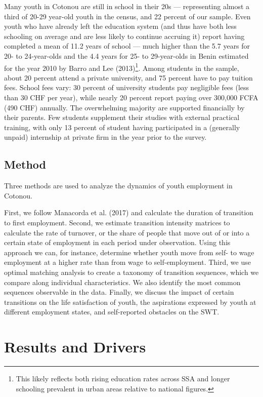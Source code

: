 \documentclass[
  11pt,
a4paper
]{article}
\begin{document}
Many youth in Cotonou are still in school in their 20s --- representing almost a third of 20-29 year-old youth in the census, and 22 percent of our sample. Even youth who have already left the education system (and thus have both less schooling on average and are less likely to continue accruing it) report having completed a mean of 11.2 years of school --- much higher than the 5.7 years for 20- to 24-year-olds and the 4.4 years for 25- to 29-year-olds in Benin estimated for the year 2010 by Barro and Lee (2013)\footnote{This likely reflects both rising education rates across SSA and longer schooling prevalent in urban areas relative to national figures.}. Among students in the sample, about 20 percent attend a private university, and 75 percent have to pay tuition fees. School fees vary: 30 percent of university students pay negligible fees (less than 30 CHF per year), while nearly 20 percent report paying over 300,000 FCFA (490 CHF) annually. The overwhelming majority are supported financially by their parents. Few students supplement their studies with external practical training, with only 13 percent of student having participated in a (generally unpaid) internship at private firm in the year prior to the survey.

\hypertarget{survey-method}{%
\subsection*{Method}\label{survey-method}}

Three methods are used to analyze the dynamics of youth employment in Cotonou.

First, we follow Manacorda et al. (2017) and calculate the duration of transition to first employment. Second, we estimate transition intensity matrices to calculate the rate of turnover, or the share of people that move out of or into a certain state of employment in each period under observation. Using this approach we can, for instance, determine whether youth move from self- to wage employment at a higher rate than from wage to self-employment. Third, we use optimal matching analysis to create a taxonomy of transition sequences, which we compare along individual characteristics. We also identify the most common sequences observable in the data. Finally, we discuss the impact of certain transitions on the life satisfaction of youth, the aspirations expressed by youth at different employment states, and self-reported obstacles on the SWT.

\hypertarget{survey-results}{%
\section{Results and Drivers}\label{survey-results}}
\end{document}
